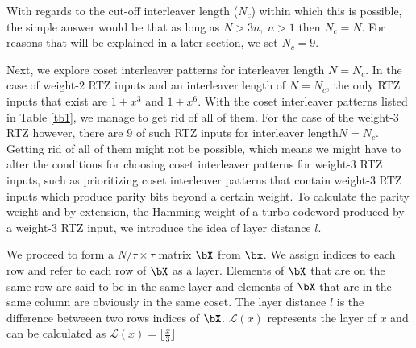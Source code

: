 \documentclass[11pt, oneside, dvipdfmx]{book}
\begin{document}
With regards to the cut-off interleaver length ($N_c$) within which this is possible, the simple answer would be that as long as $N>3n,~n>1$ then $N_c=N$. For reasons that will be explained in a later section, we set  $N_c=9$.

Next, we explore coset interleaver patterns for interleaver length $N=N_c$. In the case of weight-$2$ RTZ inputs and an interleaver length of $N=N_c$, the only RTZ inputs that exist are $1+x^3$ and $1+x^6$. With the coset interleaver patterns listed in Table \ref{tb1}, we manage to get rid of all of them. For the case of the weight-$3$ RTZ however, there are $9$ of such RTZ inputs for interleaver length$N=N_c$. Getting rid of all of them might not be possible, which means we might have to alter the conditions for choosing coset interleaver patterns for weight-$3$ RTZ inputs, such as prioritizing coset interleaver patterns that contain weight-$3$ RTZ inputs which produce parity bits beyond a certain weight. 
To calculate the parity weight and by extension, the Hamming weight of a turbo codeword produced by a weight-$3$ RTZ input, we introduce the idea of layer distance $l$.  

We proceed to form a $N/\tau \times \tau$ matrix $\bX$ from $\bx$. We assign indices to each row and refer to each row of $\bX$ as a layer. Elements of $\bX$ that are on the same row are said to be in the same layer and  elements of $\bX$  that are in the same column are obviously in the same coset.
 The layer distance $l$ is the difference betweeen two rows indices of $\bX$.
 $\mathcal{L}(x)$ represents the layer of $x$ and can be calculated as $\mathcal{L}(x)=\lfloor \frac{x}{3} \rfloor$
 
\end{document}
